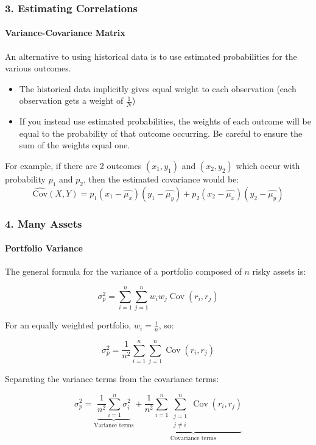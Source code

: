 \documentclass{beamer}
\begin{document}
\begin{frame}[t]
    \frametitle{3. Estimating Correlations}
    \framesubtitle{Variance-Covariance Matrix}

    An alternative to using historical data is to use estimated probabilities for the various outcomes. 
    \begin{itemize}
        \item The historical data implicitly gives equal weight to each observation (each observation gets a weight of $\frac{1}{N}$)
        \item If you instead use estimated probabilities, the weights of each outcome will be equal to the probability of that outcome occurring.   Be careful to ensure the sum of the weights equal one.
    \end{itemize}
    For example, if there are 2 outcomes $(x_1,y_1)$ and $(x_2,y_2)$ which occur with probability $p_1$ and $p_2$, then the estimated covariance would be:
    $$\widehat{\text{Cov}}(X,Y) = p_1(x_1 - \hat{\mu_x})(y_1 - \hat{\mu_y}) + p_2(x_2 - \hat{\mu_x})(y_2 - \hat{\mu_y})$$

\end{frame}

\begin{frame}[t]
\frametitle{4. Many Assets}
\framesubtitle{Portfolio Variance}

    \footnotesize
    The general formula for the variance of a portfolio composed of
    $n$ risky assets is:
    
    \[
    \sigma_p^2
    =
    \sum_{i=1}^{n}\sum_{j=1}^{n}
    w_iw_j\operatorname{Cov}(r_i,r_j)
    \]
    
    For an equally weighted portfolio, $w_i=\frac{1}{n}$, so:
    
    \[
    \sigma_p^2
    =
    \frac{1}{n^2}
    \sum_{i=1}^{n}\sum_{j=1}^{n}
    \operatorname{Cov}(r_i,r_j)
    \]
    
    Separating the variance terms from the covariance terms:
    
    \[
    \sigma_p^2
    =
    \underbrace{\frac{1}{n^2}\sum_{i=1}^{n}\sigma_i^2}
    _{\text{Variance terms}}
    +
    \underbrace{
    \frac{1}{n^2}
    \sum_{i=1}^{n}
    \sum_{\substack{j=1\\j\neq i}}^{n}
    \operatorname{Cov}(r_i,r_j)
    }_{\text{Covariance terms}}
    \]

\end{frame}
\end{document}
